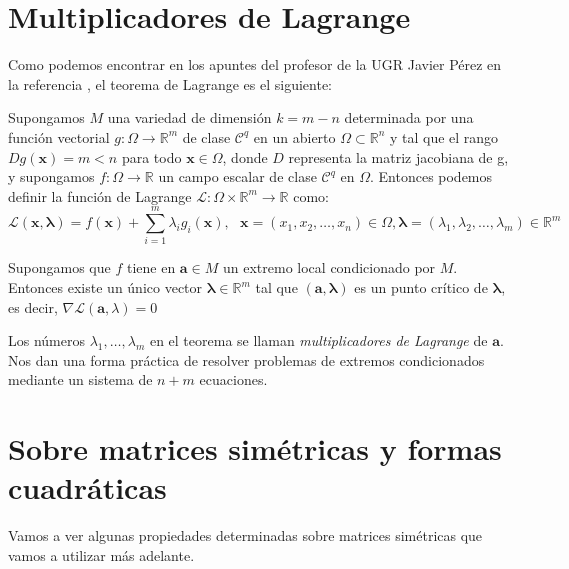 \section{Multiplicadores de Lagrange}

Como podemos encontrar en los apuntes del profesor de la UGR Javier Pérez en la referencia \cite{jperez}, el teorema de Lagrange es el siguiente:

\begin{definicion}
Supongamos $M$ una variedad de dimensión $k=m-n$ determinada por una función vectorial $g: \Omega \rightarrow \mathbb{R}^m$ de clase $\mathcal{C}^q$ en un abierto $\Omega \subset \mathbb{R}^n$ y tal que el rango $Dg(\mathbf{x}) = m < n$ para todo $\mathbf{x} \in \Omega$, donde $D$ representa la matriz jacobiana de g, y supongamos $f: \Omega \rightarrow \mathbb{R}$ un campo escalar de clase $\mathcal{C}^q$ en $\Omega$. Entonces podemos definir la función de Lagrange $\mathcal{L}: \Omega \times \mathbb{R}^m \rightarrow \mathbb{R}$ como:
\[	\mathcal{L}(\mathbf{x}, \mathbf{\lambda}) = f(\mathbf{x}) + \sum_{i=1}^{m} \lambda_ig_i(\mathbf{x}), \ \ \  \mathbf{x} = (x_1, x_2, \dots, x_n) \in \Omega, \mathbf{\lambda} = (\lambda_1, \lambda_2, \dots, \lambda_m) \in \mathbb{R}^m	\]
\end{definicion}

\begin{teorema}[de Lagrange]
Supongamos que $f$ tiene en $\mathbf{a} \in M$ un extremo local condicionado por $M$. Entonces existe un único vector $\mathbf{\lambda} \in \mathbb{R}^m$ tal que $(\mathbf{a}, \mathbf{\lambda})$ es un punto crítico de $\mathbf{\lambda}$, es decir, $\nabla \mathcal{L}(\mathbf{a}, \mathbb{\lambda}) = 0$
\end{teorema}

Los números $\lambda_1, \dots, \lambda_m$ en el teorema se llaman \textit{multiplicadores de Lagrange} de $\mathbf{a}$. Nos dan una forma práctica de resolver problemas de extremos condicionados mediante un sistema de $n+m$ ecuaciones.

\section{Sobre matrices simétricas y formas cuadráticas}
Vamos a ver algunas propiedades determinadas sobre matrices simétricas que vamos a utilizar más adelante.\\

